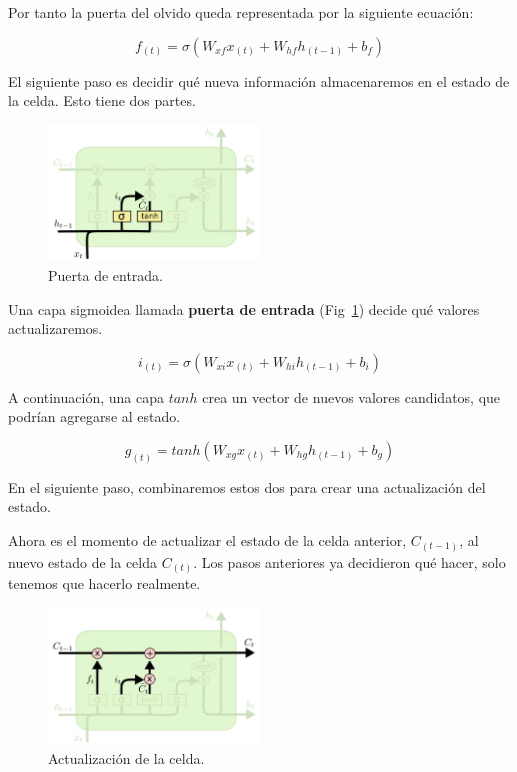 \documentclass[a4paper,12pt]{article}
\begin{document}
Por tanto la puerta del olvido queda representada por la siguiente ecuación:

$$f_{(t)} = \sigma (W_{xf}x_{(t)} + W_{hf}h_{(t-1)} + b_f)$$

El siguiente paso es decidir qué nueva información almacenaremos en el estado de la celda. Esto tiene dos partes. 

\begin{figure}[H]
	\begin{center}				
		\includegraphics[width=0.5\textwidth]{lstm3.png}
		\caption{Puerta de entrada. \citep{olahlstm}}
		\label{fig:lstm3}
	\end{center}
\end{figure}

Una capa sigmoidea llamada \textbf{puerta de entrada} (Fig~\ref{fig:lstm3}) decide qué valores actualizaremos.

$$i_{(t)}=\sigma(W_{xi}x_{(t)} + W_{hi}h_{(t-1)} + b_i)$$

A continuación, una capa $tanh$ crea un vector de nuevos valores candidatos, que podrían agregarse al estado. 

$$g_{(t)}=tanh(W_{xg}x_{(t)}+W_{hg}h_{(t-1)}+b_g)$$


En el siguiente paso, combinaremos estos dos para crear una actualización del estado.

Ahora es el momento de actualizar el estado de la celda anterior, $C_{(t-1)}$, al nuevo estado de la celda $C_{(t)}$. Los pasos anteriores ya decidieron qué hacer, solo tenemos que hacerlo realmente.

\begin{figure}[H]
	\begin{center}				
		\includegraphics[width=0.5\textwidth]{lstm4.png}
		\caption{Actualización de la celda. \citep{olahlstm}}
		\label{fig:lstm4}
	\end{center}
\end{figure}
\end{document}

